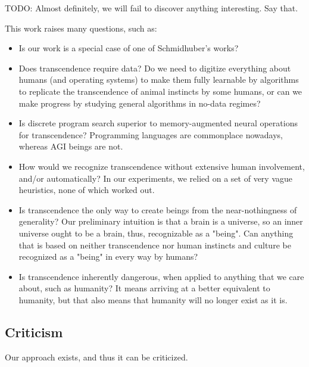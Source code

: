 \documentclass{article}
\begin{document}
    TODO: Almost definitely, we will fail to discover anything interesting. Say that.

This work raises many questions, such as:

\begin{itemize}
\item Is our work is a special case of one of Schmidhuber's works?

\item Does transcendence require data? Do we need to digitize everything about humans (and operating systems) to make them fully learnable by algorithms to replicate the transcendence of animal instincts by some humans, or can we make progress by studying general algorithms in no-data regimes?

\item Is discrete program search superior to memory-augmented neural operations for transcendence? Programming languages are commonplace nowadays, whereas AGI beings are not.

\item How would we recognize transcendence without extensive human involvement, and/or automatically? In our experiments, we relied on a set of very vague heuristics, none of which worked out.

\item Is transcendence the only way to create beings from the near-nothingness of generality? Our preliminary intuition is that a brain is a universe, so an inner universe ought to be a brain, thus, recognizable as a "being". Can anything that is based on neither transcendence nor human instincts and culture be recognized as a "being" in every way by humans?

\item Is transcendence inherently dangerous, when applied to anything that we care about, such as humanity? It means arriving at a better equivalent to humanity, but that also means that humanity will no longer exist as it is.
\end{itemize}

\subsection{Criticism}

Our approach exists, and thus it can be criticized.
\end{document}
